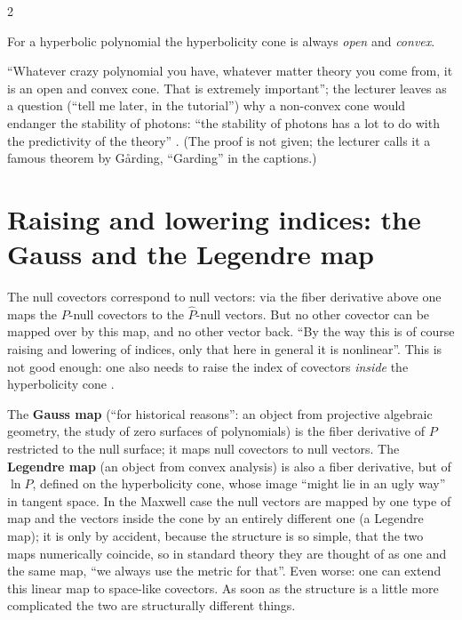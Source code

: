 \begin{paracol}{2}
\begin{theorem}[G{\aa}rding]\label{thm:c26-garding}
For a hyperbolic polynomial the hyperbolicity cone is always \emph{open} and \emph{convex}.
\end{theorem}
``Whatever crazy polynomial you have, whatever matter theory you come from, it is an open and convex cone. That is extremely important''; the lecturer leaves as a question (``tell me later, in the tutorial'') why a non-convex cone would endanger the stability of photons: ``the stability of photons has a lot to do with the predictivity of the theory'' . (The proof is not given; the lecturer calls it a famous theorem by G{\aa}rding, ``Garding'' in the captions.)

\section{Raising and lowering indices: the Gauss and the Legendre map}\label{sec:c26-maps}

The null covectors correspond to null vectors: via the fiber derivative above one maps the $P$-null covectors to the $\hat P$-null vectors. But no other covector can be mapped over by this map, and no other vector back. ``By the way this is of course raising and lowering of indices, only that here in general it is nonlinear''. This is not good enough: one also needs to raise the index of covectors \emph{inside} the hyperbolicity cone .

\begin{definition}\label{def:c26-maps}
The \textbf{Gauss map} (``for historical reasons'': an object from projective algebraic geometry, the study of zero surfaces of polynomials) is the fiber derivative of $P$ restricted to the null surface; it maps null covectors to null vectors. The \textbf{Legendre map} (an object from convex analysis) is also a fiber derivative, but of $\ln P$, defined on the hyperbolicity cone, whose image ``might lie in an ugly way'' in tangent space. In the Maxwell case the null vectors are mapped by one type of map and the vectors inside the cone by an entirely different one (a Legendre map); it is only by accident, because the structure is so simple, that the two maps numerically coincide, so in standard theory they are thought of as one and the same map, ``we always use the metric for that''. Even worse: one can extend this linear map to space-like covectors. As soon as the structure is a little more complicated the two are structurally different things.
\end{definition}


\end{paracol}
